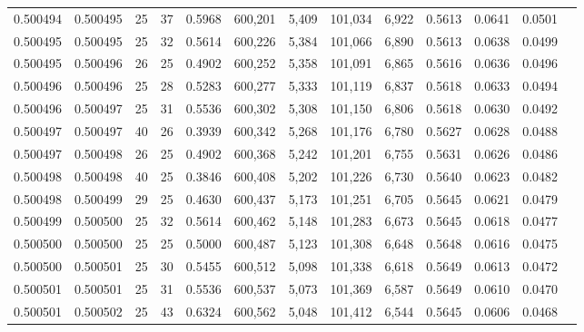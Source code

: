 \begin{tabular}{rrrrrrrrrrrrr}
0.500494 & 0.500495 &    25 &  37 &                                     0.5968 & 600,201 &   5,409 & 101,034 &   6,922 & 0.5613 & 0.0641 & 0.0501 \\
0.500495 & 0.500495 &    25 &  32 &                                     0.5614 & 600,226 &   5,384 & 101,066 &   6,890 & 0.5613 & 0.0638 & 0.0499 \\
0.500495 & 0.500496 &    26 &  25 &                                     0.4902 & 600,252 &   5,358 & 101,091 &   6,865 & 0.5616 & 0.0636 & 0.0496 \\
0.500496 & 0.500496 &    25 &  28 &                                     0.5283 & 600,277 &   5,333 & 101,119 &   6,837 & 0.5618 & 0.0633 & 0.0494 \\
0.500496 & 0.500497 &    25 &  31 &                                     0.5536 & 600,302 &   5,308 & 101,150 &   6,806 & 0.5618 & 0.0630 & 0.0492 \\
0.500497 & 0.500497 &    40 &  26 &                                     0.3939 & 600,342 &   5,268 & 101,176 &   6,780 & 0.5627 & 0.0628 & 0.0488 \\
0.500497 & 0.500498 &    26 &  25 &                                     0.4902 & 600,368 &   5,242 & 101,201 &   6,755 & 0.5631 & 0.0626 & 0.0486 \\
0.500498 & 0.500498 &    40 &  25 &                                     0.3846 & 600,408 &   5,202 & 101,226 &   6,730 & 0.5640 & 0.0623 & 0.0482 \\
0.500498 & 0.500499 &    29 &  25 &                                     0.4630 & 600,437 &   5,173 & 101,251 &   6,705 & 0.5645 & 0.0621 & 0.0479 \\
0.500499 & 0.500500 &    25 &  32 &                                     0.5614 & 600,462 &   5,148 & 101,283 &   6,673 & 0.5645 & 0.0618 & 0.0477 \\
0.500500 & 0.500500 &    25 &  25 &                                     0.5000 & 600,487 &   5,123 & 101,308 &   6,648 & 0.5648 & 0.0616 & 0.0475 \\
0.500500 & 0.500501 &    25 &  30 &                                     0.5455 & 600,512 &   5,098 & 101,338 &   6,618 & 0.5649 & 0.0613 & 0.0472 \\
0.500501 & 0.500501 &    25 &  31 &                                     0.5536 & 600,537 &   5,073 & 101,369 &   6,587 & 0.5649 & 0.0610 & 0.0470 \\
0.500501 & 0.500502 &    25 &  43 &                                     0.6324 & 600,562 &   5,048 & 101,412 &   6,544 & 0.5645 & 0.0606 & 0.0468 \\

\end{tabular}

